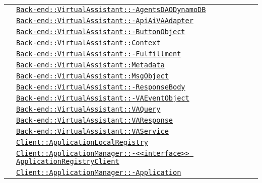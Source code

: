 \begin{longtable}{|>{\centering}m{3cm}|m{10cm}<{\centering}|}
& \hyperref[Back-end::VirtualAssistant::AgentsDAODynamoDB]{\texttt{Back-end::VirtualAssistant::-\linebreak AgentsDAODynamoDB}}\\
& \hyperref[Back-end::VirtualAssistant::ApiAiVAAdapter]{\texttt{Back-end::VirtualAssistant::-\linebreak ApiAiVAAdapter}}\\
& \hyperref[Back-end::VirtualAssistant::ButtonObject]{\texttt{Back-end::VirtualAssistant::-\linebreak ButtonObject}}\\
& \hyperref[Back-end::VirtualAssistant::Context]{\texttt{Back-end::VirtualAssistant::Context}}\\
& \hyperref[Back-end::VirtualAssistant::Fulfillment]{\texttt{Back-end::VirtualAssistant::-\linebreak Fulfillment}}\\
& \hyperref[Back-end::VirtualAssistant::Metadata]{\texttt{Back-end::VirtualAssistant::Metadata}}\\
& \hyperref[Back-end::VirtualAssistant::MsgObject]{\texttt{Back-end::VirtualAssistant::MsgObject}}\\
& \hyperref[Back-end::VirtualAssistant::ResponseBody]{\texttt{Back-end::VirtualAssistant::-\linebreak ResponseBody}}\\
& \hyperref[Back-end::VirtualAssistant::VAEventObject]{\texttt{Back-end::VirtualAssistant::-\linebreak VAEventObject}}\\
& \hyperref[Back-end::VirtualAssistant::VAQuery]{\texttt{Back-end::VirtualAssistant::VAQuery}}\\
& \hyperref[Back-end::VirtualAssistant::VAResponse]{\texttt{Back-end::VirtualAssistant::VAResponse}}\\
& \hyperref[Back-end::VirtualAssistant::VAService]{\texttt{Back-end::VirtualAssistant::VAService}}\\
& \hyperref[Client::ApplicationLocalRegistry]{\texttt{Client::ApplicationLocalRegistry}}\\
& \hyperref[Client::ApplicationManager::<<interface>> ApplicationRegistryClient]{\texttt{Client::ApplicationManager::-\linebreak <<interface>> ApplicationRegistryClient}}\\
& \hyperref[Client::ApplicationManager::Application]{\texttt{Client::ApplicationManager::-\linebreak Application}}\\

\end{longtable}
